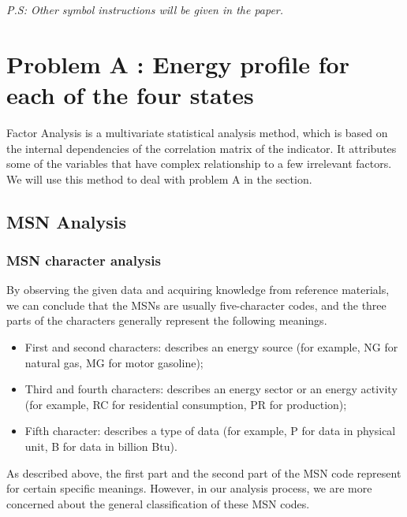 \documentclass[a4paper,11pt]{article}
\begin{document}
\emph{P.S: Other symbol instructions will be given in the paper.}







\section{Problem A : Energy profile for each of the four states}
\par Factor Analysis is a multivariate statistical analysis method, which is based on the internal dependencies of the correlation matrix of the indicator. It attributes some of the variables that have complex relationship to a few irrelevant factors.\cite{2} We will use this method to deal with problem A in the section.

\subsection{MSN Analysis}
\subsubsection {MSN character analysis}

\par  By observing the given data and acquiring knowledge from reference materials, we can conclude that the MSNs are usually five-character codes, and the three parts of the characters generally represent the following meanings.

\begin{itemize}
    \item First and second characters: describes an energy source (for example, NG for natural gas, MG for motor gasoline);
    \item Third and fourth characters: describes an energy sector or an energy activity (for example, RC for residential consumption, PR for production);
    \item Fifth character: describes a type of data (for example, P for data in physical unit, B for data in billion Btu).	\cite{3}
\end{itemize}

\par As described above, the first part and the second part of the MSN code represent for certain specific meanings. However, in our analysis process, we are more concerned about the general classification of these MSN codes. 
\end{document}
